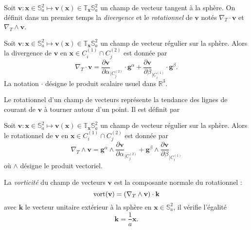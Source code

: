 Soit $\mathbf{v} : \mathbf{x} \in \mathbb{S}_a^2 \mapsto \mathbf{v}(\mathbf{x}) \in \mathbb{T}_{\mathbf{x}} \mathbb{S}_a^2$ un champ de vecteur tangent à la sphère. On définit dans un premier temps la \textit{divergence} et le \textit{rotationnel} de $\mathbf{v}$ notés $\nabla_T \cdot \mathbf{v}$ et $\nabla_T \wedge \mathbf{v}$.

\begin{definition}
Soit $\mathbf{v} : \mathbf{x} \in \mathbb{S}_a^2 \mapsto \mathbf{v}(\mathbf{x}) \in \mathbb{T}_{\mathbf{x}} \mathbb{S}_a^2$ un champ de vecteur régulier sur la sphère. Alors la divergence de $\mathbf{v}$ en $\mathbf{x} \in C_i^{(1)} \cap C_j^{(2)}$ est donnée par
\begin{equation}
\nabla_T \cdot \mathbf{v} = \dfrac{\partial \mathbf{v}}{\partial \alpha}_{|C^{(2)}_j} \cdot \mathbf{g}^{\alpha} + \dfrac{\partial \mathbf{v}}{\partial \beta}_{|C^{(1)}_i} \cdot \mathbf{g}^{\beta}.
\end{equation}
\label{def:divergence}
La notation $\cdot$ désigne le produit scalaire usuel dans $\mathbb{R}^3$.
\end{definition}
Le rotationnel d'un champ de vecteurs représente la tendance des lignes de courant de $\mathbf{v}$ à tourner autour d'un point. Il est définit par

\begin{definition}
Soit $\mathbf{v} : \mathbf{x} \in \mathbb{S}_a^2 \mapsto \mathbf{v}(\mathbf{x}) \in \mathbb{T}_{\mathbf{x}} \mathbb{S}_a^2$ un champ de vecteur régulier sur la sphère. Alors le rotationnel de $\mathbf{v}$ en $\mathbf{x} \in C_i^{(1)} \cap C_j^{(2)}$ est donnée par
\begin{equation}
\nabla_T \wedge \mathbf{v} =  \mathbf{g}^{\alpha} \wedge \dfrac{\partial \mathbf{v}}{\partial \alpha}_{|C^{(2)}_j} + \mathbf{g}^{\beta} \wedge \dfrac{\partial \mathbf{v}}{\partial \beta}_{|C^{(1)}_i}
\end{equation}
où $\wedge$ désigne le produit vectoriel.
\label{def:rotationnel}
\end{definition}
La \textit{vorticité} du champ de vecteurs $\mathbf{v}$ est la composante normale du rotationnel :
\begin{equation}
\text{vort} ( \mathbf{v} ) = \left( \nabla_T \wedge \mathbf{v} \right) \cdot \mathbf{k}
\label{eq:vorticité}
\end{equation}
avec $\mathbf{k}$ le vecteur unitaire extérieur à la sphère en $\mathbf{x} \in \mathbb{S}_a^2$, il vérifie l'égalité
\begin{equation}
\mathbf{k} = \dfrac{1}{a} \mathbf{x}.
\end{equation}


